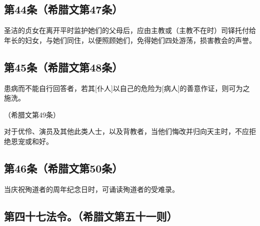 
\subsection{第44条（希腊文第47条）}

\par

圣洁的贞女在离开平时监护她们的父母后，应由主教或（主教不在时）司铎托付给年长的妇女，与她们同住，以便照顾她们，免得她们四处游荡，损害教会的声誉。\par


\subsection{第45条（希腊文第48条）}

\par

患病而不能自行回答者，若其[仆人]以自己的危险为[病人]的善意作证，则可为之施洗。\par

（希腊文第49条）\par

\par

对于优伶、演员及其他此类人士，以及背教者，当他们悔改并归向天主时，不应拒绝恩宠或和好。\par


\subsection{第46条（希腊文第50条）}

\par

当庆祝殉道者的周年纪念日时，可诵读殉道者的受难录。\par


\subsection{第四十七法令。（希腊文第五十一则）}

